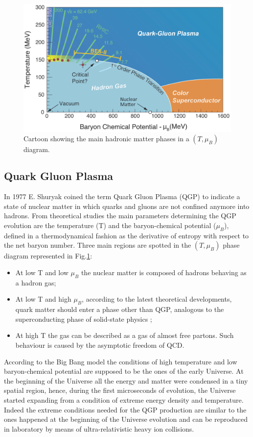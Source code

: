 \begin{figure}[!t]
\begin{center}
\includegraphics[width=0.85\linewidth]{Chapters/Introduction/Figs/QGPPhases.pdf}
\caption{Cartoon showing the main hadronic matter phases in a $(T,\mu_B)$ diagram.}
\label{fig:QGPPhases}
\end{center}
\end{figure}

\subsection{Quark Gluon Plasma}
In 1977 E. Shuryak coined the term Quark Gluon Plasma (QGP) to indicate a state of nuclear matter in which quarks and gluons are not confined anymore into hadrons.
From theoretical studies the main parameters determining the QGP evolution are the temperature (T) and the baryon-chemical potential ($\mu_B$), defined in a thermodynamical fashion as the derivative of entropy with respect to the net baryon number.
Three main regions are spotted in the $(T,\mu_B)$ phase diagram represented in Fig.\ref{fig:QGPPhases}:
\begin{itemize}
    \item At low T and low $\mu_B$ the nuclear matter is composed of hadrons behaving as a hadron gas;
    \item At low T and high $\mu_B$, according to the latest theoretical developments, quark matter should enter a phase other than QGP, analogous to the superconducting phase of solid-state physics \cite{Alford:2007xm};
    \item At high T the gas can be described as a gas of almost free partons. Such behaviour is caused by the asymptotic freedom of QCD.
\end{itemize}

According to the Big Bang model the conditions of high temperature and low baryon-chemical potential are supposed to be the ones of the early Universe.
At the beginning of the Universe all the energy and matter were condensed in a tiny spatial region, hence, during the first microseconds of evolution, the Universe started expanding from a condition of extreme energy density and temperature.
Indeed the extreme conditions needed for the QGP production are similar to the ones happened at the beginning of the Universe evolution and can be reproduced in laboratory by means of ultra-relativistic heavy ion collisions.

